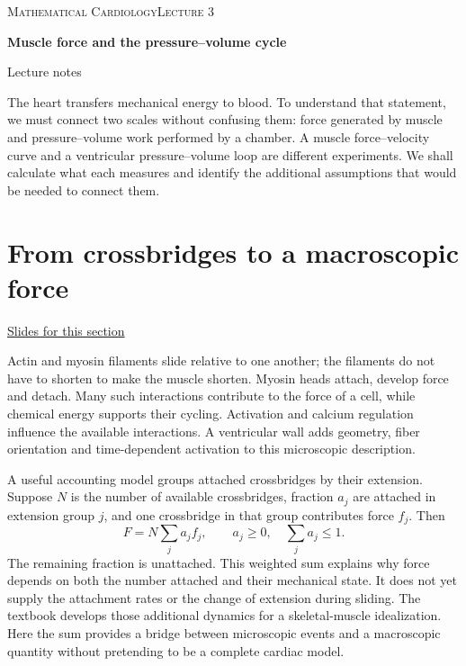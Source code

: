 \documentclass[11pt,letterpaper]{article}
\theoremstyle{definition}\newtheorem{definition}{Definition}\newtheorem{example}{Example}
\numberwithin{equation}{section}
\begin{document}
{\small\scshape Mathematical Cardiology\hfill Lecture 3}\par\medskip
{\raggedright{}\LARGE\bfseries\color{ink} Muscle force and the pressure--volume cycle\par}\medskip
{\small Lecture notes}\par\bigskip
The heart transfers mechanical energy to blood. To understand that statement, we must connect two scales without confusing them: force generated by muscle and pressure--volume work performed by a chamber. A muscle force--velocity curve and a ventricular pressure--volume loop are different experiments. We shall calculate what each measures and identify the additional assumptions that would be needed to connect them.

\section{From crossbridges to a macroscopic force}
\hypertarget{note-from-crossbridges-to-a-macroscopic-force}{}\label{note:from-crossbridges-to-a-macroscopic-force}
{\small \href{slides.html\#frame=two-levels-of-a-pumping-system\&step=1}{Slides for this section}}\par
Actin and myosin filaments slide relative to one another; the filaments do not have to shorten to make the muscle shorten. Myosin heads attach, develop force and detach. Many such interactions contribute to the force of a cell, while chemical energy supports their cycling. Activation and calcium regulation influence the available interactions. A ventricular wall adds geometry, fiber orientation and time-dependent activation to this microscopic description.

A useful accounting model groups attached crossbridges by their extension. Suppose $N$ is the number of available crossbridges, fraction $a_j$ are attached in extension group $j$, and one crossbridge in that group contributes force $f_j$. Then
\begin{equation}
F=N\sum_j a_j f_j,\qquad a_j\ge0,\quad\sum_j a_j\le1.
\end{equation}
The remaining fraction is unattached. This weighted sum explains why force depends on both the number attached and their mechanical state. It does not yet supply the attachment rates or the change of extension during sliding. The textbook develops those additional dynamics for a skeletal-muscle idealization. Here the sum provides a bridge between microscopic events and a macroscopic quantity without pretending to be a complete cardiac model.
\end{document}
